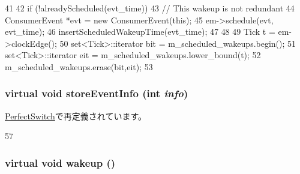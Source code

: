 \begin{DoxyCode}
41 {
42     if (!alreadyScheduled(evt_time)) {
43         // This wakeup is not redundant
44         ConsumerEvent *evt = new ConsumerEvent(this);
45         em->schedule(evt, evt_time);
46         insertScheduledWakeupTime(evt_time);
47     }
48 
49     Tick t = em->clockEdge();
50     set<Tick>::iterator bit = m_scheduled_wakeups.begin();
51     set<Tick>::iterator eit = m_scheduled_wakeups.lower_bound(t);
52     m_scheduled_wakeups.erase(bit,eit);
53 }
\end{DoxyCode}
\hypertarget{classConsumer_a6f82fdec6e5674ac2254f16b8fa82afb}{
\subsubsection[{storeEventInfo}]{\setlength{\rightskip}{0pt plus 5cm}virtual void storeEventInfo (int {\em info})}}
\label{classConsumer_a6f82fdec6e5674ac2254f16b8fa82afb}


\hyperlink{classPerfectSwitch_accd0665763c9caa446789b27a62f931b}{PerfectSwitch}で再定義されています。


\begin{DoxyCode}
57 {}
\end{DoxyCode}
\hypertarget{classConsumer_a623e3e7d1b1c725d70009f7b01a421b9}{
\subsubsection[{wakeup}]{\setlength{\rightskip}{0pt plus 5cm}virtual void wakeup ()}}
\label{classConsumer_a623e3e7d1b1c725d70009f7b01a421b9}


